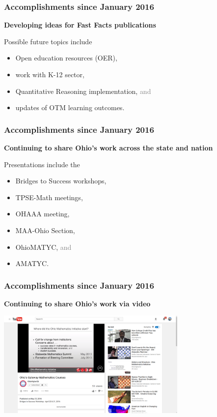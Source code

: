 \documentclass[14pt]{beamer}
\newcounter{a}
\newcounter{b}
\begin{document}
\begin{frame}
\frametitle{Accomplishments since January 2016}

\textbf{Developing ideas for Fast Facts publications}

Possible future topics include
\begin{itemize}
\item Open education resources (OER),
\item work with K-12 sector,
\item Quantitative Reasoning implementation, \textcolor{gray}{and}
\item updates of OTM learning outcomes.
\end{itemize}

\end{frame}


\begin{frame}
\frametitle{Accomplishments since January 2016}

\textbf{Continuing to share Ohio's work across the state and nation}

Presentations include the
\begin{itemize}
\item Bridges to Success workshops, 
\item TPSE-Math meetings, 
\item OHAAA meeting,
\item MAA-Ohio Section,
\item OhioMATYC, \textcolor{gray}{and}
\item AMATYC.
\end{itemize}

\end{frame}

\begin{frame}
\frametitle{Accomplishments since January 2016}

\textbf{Continuing to share Ohio's work via video}

\begin{center}
  \includegraphics[width=0.7\textwidth]{video-screenshot.png}
\end{center}

\end{frame}
\end{document}
